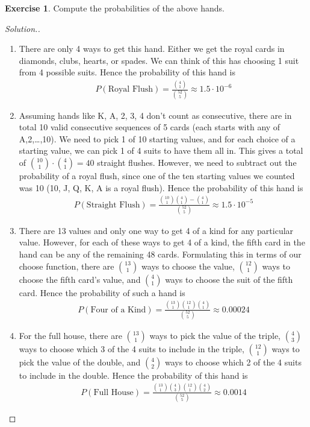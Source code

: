 \documentclass{tufte-book}
\theoremstyle{definition}
\numberwithin{theorem}{section}
\numberwithin{definition}{section}
\numberwithin{lemma}{section}
\numberwithin{corollary}{section}
\numberwithin{proposition}{section}
\numberwithin{remark}{section}
\numberwithin{claim}{section}
\numberwithin{observation}{section}
\numberwithin{fact}{section}
\numberwithin{assumption}{section}
\numberwithin{example}{section}
\newtheorem{exercise}[theorem]{Exercise}
\numberwithin{exercise}{section}
\begin{document}
\begin{exercise}
Compute the probabilities of the above hands.
\end{exercise}
\begin{proof}[Solution.]
$ $
\begin{enumerate}
\item There are only 4 ways to get this hand. Either we get the royal cards in diamonds, clubs, hearts, or spades. We can think of this has choosing 1 suit from 4 possible suits. Hence the probability of this hand is
\begin{align*}
P(\text{Royal Flush}) = \frac{\binom{4}{1}}{\binom{52}{5}} \approx 1.5 \cdot 10^{-6}
\end{align*}

\item Assuming hands like K, A, 2, 3, 4 don't count as consecutive, there are in total 10 valid consecutive sequences of 5 cards (each starts with any of A,2,\dots,10). We need to pick 1 of 10 starting values, and for each choice of a starting value, we can pick 1 of 4 suits to have them all in. This gives a total of $\binom{10}{1} \cdot \binom{4}{1} = 40$ straight flushes. However, we need to subtract out the probability of a royal flush, since one of the ten starting values we counted was 10 (10, J, Q, K, A is a royal flush). Hence the probability of this hand is
\begin{align*}
P(\text{Straight Flush}) = \frac{\binom{10}{1}  \binom{4}{1}-\binom{4}{1}}{\binom{52}{5}} \approx 1.5 \cdot 10^{-5}
\end{align*}

\item There are 13 values and only one way to get 4 of a kind for any particular value. However, for each of these ways to get 4 of a kind, the fifth card in the hand can be any of the remaining 48 cards. Formulating this in terms of our choose function, there are $\binom{13}{1}$ ways to choose the value, $\binom{12}{1}$ ways to choose the fifth card's value, and $\binom{4}{1}$ ways to choose the suit of the fifth card. Hence the probability of such a hand is
\begin{align*}
P(\text{Four of a Kind}) = \frac{\binom{13}{1}\binom{12}{1}\binom{4}{1}}{\binom{52}{5}} \approx 0.00024
\end{align*}

\item For the full house, there are $\binom{13}{1}$ ways to pick the value of the triple, $\binom{4}{3}$ ways to choose which 3 of the 4 suits to include in the triple, $\binom{12}{1}$ ways to pick the value of the double, and $\binom{4}{2}$ ways to choose which 2 of the 4 suits to include in the double. Hence the probability of this hand is
\begin{align*}
P(\text{Full House}) = \frac{\binom{13}{1} \binom{4}{3} \binom{12}{1}\binom{4}{2}}{\binom{52}{5}} \approx 0.0014
\end{align*}


\end{enumerate}
\end{proof}
\end{document}
